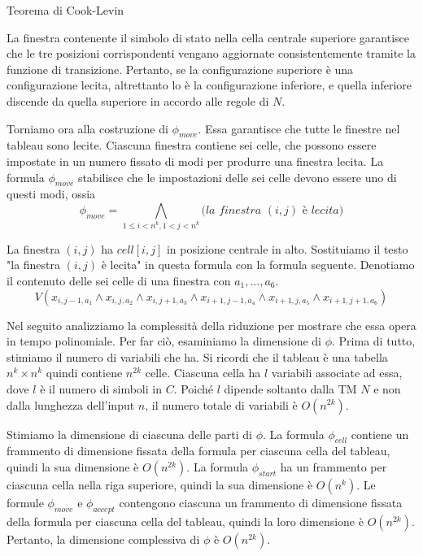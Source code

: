 \begin{Thm}{Teorema di Cook-Levin}{}
\begin{demonstration}
La finestra contenente il simbolo di stato nella cella centrale superiore garantisce che le tre posizioni corrispondenti vengano aggiornate consistentemente tramite la funzione di transizione. Pertanto, se la configurazione superiore è una configurazione lecita, altrettanto lo è la configurazione inferiore, e quella inferiore discende da quella superiore in accordo alle regole di $N$.

Torniamo ora alla costruzione di $\phi_{move}$. Essa garantisce che tutte le finestre nel tableau sono lecite. Ciascuna finestra contiene sei celle, che possono essere impostate in un numero fissato di modi per produrre una finestra lecita. La formula $\phi_{move}$ stabilisce che le impostazioni delle sei celle devono essere uno di questi modi, ossia
\begin{equation*}
    \phi_{move} = \bigwedge_{1\leq i < n^k, 1<j<n^k} \textit{(la finestra }(i,j)\textit{ è lecita)}
\end{equation*}

La finestra $(i, j)$ ha $cell[i, j]$ in posizione centrale in alto. Sostituiamo il testo "la finestra $(i, j)$ è lecita" in questa formula con la formula seguente. Denotiamo il contenuto delle sei celle di una finestra con $a_{1} ,...,a_6$.
\begin{equation*}
    V (x_{i,j-1,a_{1}}\land x_{i,j,a_2}\land x_{i,j+1,a_3}\land x_{i+1,j-1,a_4}\land x_{i+1,j,a_5}\land x_{i+1,j+1,a_6})   
\end{equation*}

Nel seguito analizziamo la complessità della riduzione per mostrare che essa opera in tempo polinomiale. Per far ciò, esaminiamo la dimensione di $\phi$. Prima di tutto, stimiamo il numero di variabili che ha. Si ricordi che il tableau è una tabella $n ^ k \times n ^ k$ quindi contiene $n ^{2k}$ celle. Ciascuna cella ha $l$ variabili associate ad essa, dove $l$ è il numero di simboli in $C$. Poiché $l$ dipende soltanto dalla TM $N$ e non dalla lunghezza dell'input $n$, il numero totale di variabili è $O(n^{2k})$.

Stimiamo la dimensione di ciascuna delle parti di $\phi$. La formula $\phi_{cell}$ contiene un frammento di dimensione fissata della formula per ciascuna cella del tableau, quindi la sua dimensione è $O(n^{2k})$. La formula $\phi_{start}$ ha un frammento per ciascuna cella nella riga superiore, quindi la sua dimensione è $O(n ^ k)$. Le formule $\phi_{move}$ e $\phi_{accept}$ contengono ciascuna un frammento di dimensione fissata della formula per ciascuna cella del tableau, quindi la loro dimensione è $O(n^{2k})$. Pertanto, la dimensione complessiva di $\phi$ è $O(n^{2k})$.
\end{demonstration}
\end{Thm}

